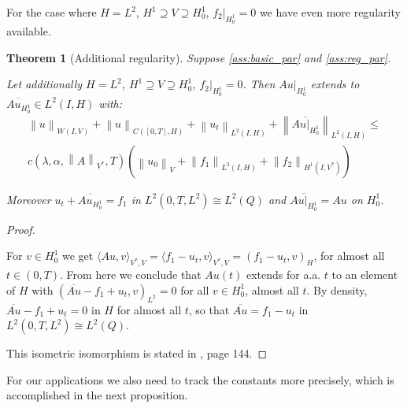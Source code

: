 \documentclass[english,a4paper,10pt,oneside]{scrbook}	%
\theoremstyle{break}
\newtheorem{thm}[equation]{Theorem}
\newenvironment{mproof}[1][\proofname]{%
  \begin{proof}[#1]$ $\par\nobreak\ignorespaces
}{%
  \end{proof}
}
\renewcommand*{\proofname}{Proof}
\theoremstyle{remark}
\newcommand{\norm}[1]{\left\lVert#1\right\rVert}
\newcommand{\VN}[1]{\norm{#1}_{V}}
\newcommand{\VSN}[1]{\norm{#1}_{V^*}}
\begin{document}
For the case where $H=L^2$, $H^1\supseteq V\supseteq H^1_0$,  $f_2|_{H^1_0}=0$ we have even more regularity available.

\begin{thm}[Additional regularity]
\label{thm:par_reg}
Suppose \cref{ass:basic_par} and \cref{ass:reg_par}. 

Let additionally $H=L^2$, $H^1\supseteq V\supseteq H^1_0$,  $f_2|_{H^1_0}=0$. Then $Au|_{H^1_0}$ extends to $\overline{Au_{H^1_0}} \in L^2(I,H)$ with:
\begin{align}
	\norm{u}_{W(I,V)} + \norm{u}_{C([0,T],H)} + \norm{u_t}_{L^2(I,H)} +\norm{\overline{Au|_{H^1_0}}}_{L^2(I,H)}\leq\\ c(\lambda, \alpha, \VSN{A}, T)(\VN{u_0}+\norm{f_1}_{L^2(I,H)} + \norm{f_2}_{H^1(I,V^*)})
\end{align}

Moreover $u_t+\overline{Au_{H^1_0}}=f_1$ in $L^2(0,T,L^2)\cong L^2(Q)$ and $\overline{Au|_{H^1_0}}=Au$ on $H^1_0$.

\end{thm}
\begin{mproof}

For $v \in H^1_0$ we get $ \langle Au,v \rangle_{V^*,V} =  \langle f_1-u_t,v \rangle_{V^*,V} = ( f_1-u_t,v )_H$, for almost all $t \in (0,T)$. From here we conclude that $Au(t)$ extends for a.a. $t$ to an element of $H$ with $(\overline{Au}-f_1+u_t,v)_{L^2}=0$ for all $v \in H^1_0$, almost all $t$. By density, $\overline{Au}-f_1+u_t=0$ in $H$ for almost all $t$, so that $\overline{Au}=f_1-u_t$ in $L^2(0,T,L^2)\cong L^2(Q)$.

This isometric isomorphism is stated in \cite{trol}, page 144. 

\end{mproof}

For our applications we also need to track the constants more precisely, which is accomplished in the next proposition.
\end{document}
